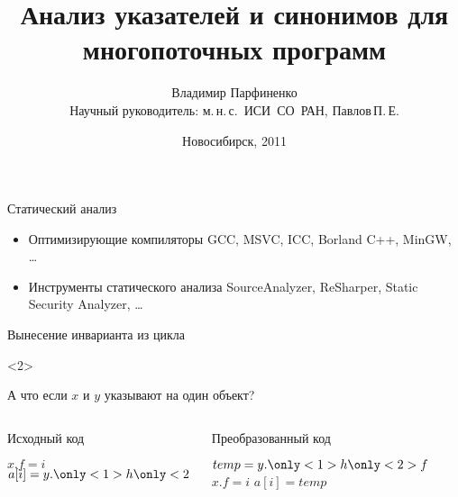 \documentclass[usenames,dvipsnames,pdftex,unicode]{beamer}
\title[Анализ указателей и синонимов]{
  Анализ указателей и синонимов для многопоточных программ
}
\author[Владимир Парфиненко]{
  Владимир Парфиненко\\
  {\small Научный руководитель: м.\,н.\,с.~ИСИ~СО~РАН, Павлов\,П.\,Е.}
}
\institute{
  Новосибирский Государственный Университет
}
\date{
  Новосибирск, 2011
}
\begin{document}
\begin{frame}
  \titlepage
\end{frame}

\begin{frame}{Статический анализ}

  \begin{itemize}
    \item Оптимизирующие компиляторы\newline
        GCC, MSVC, ICC, Borland C++, MinGW, \ldots
    \item Инструменты статического анализа\newline
        SourceAnalyzer, ReSharper, Static Security Analyzer, \ldots
  \end{itemize}

\end{frame}

\begin{frame}{Вынесение инварианта из цикла}

  \begin{visibleenv}<2>
    \begin{center}
      \large А что если $x$ и $y$ указывают на один объект?
    \end{center}
  \end{visibleenv}

  \begin{columns}[t]
    \begin{column}{5cm}
      \begin{block}{Исходный код}
        \begin{algorithmic}
          \STATE $x.f = i$
          \STATE $a[i] = y.\only<1>{h}\only<2>{f}$
          \ENDFOR
        \end{algorithmic}
      \end{block}
    \end{column}
    \begin{column}{5cm}
      \begin{block}{Преобразованный код}
        \begin{algorithmic}
          \STATE $temp = y.\only<1>{h}\only<2>{f}$
          \STATE $x.f = i$
          \STATE $a[i] = temp$
          \ENDFOR
        \end{algorithmic}
      \end{block}
    \end{column}
  \end{columns}

\end{frame}
\end{document}
